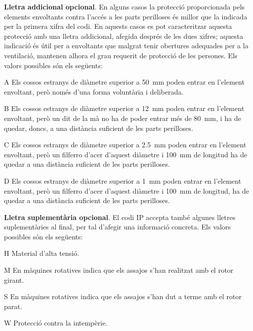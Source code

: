 \textbf{Lletra addicional opcional}. En alguns casos la protecció
proporcionada pels elements envoltants contra l'accés a les parts
perilloses és millor que la indicada per la primera xifra del codi.
En aquests casos es pot caracteritzar aquesta protecció amb una
lletra addicional, afegida després de les dues xifres; aquesta indicació és útil per a  envoltants que malgrat tenir obertures adequades per a la ventilació,  mantenen alhora el
grau requerit de protecció de les persones. Els valors possibles són
els següents:
\begin{list}{}
   {\setlength{\labelwidth}{10mm} \setlength{\leftmargin}{15mm} \setlength{\labelsep}{5mm}}
   \item[A] Els  cossos estranys de diàmetre superior a
   \qty{50}{mm}    poden entrar en l'element envoltant, però només d'una forma voluntària i deliberada.
   \item[B] Els  cossos estranys de diàmetre superior a \qty{12}{mm}
    poden entrar en l'element envoltant, però un dit de la mà no ha de poder entrar més de \qty{80}{mm}, i
    ha de quedar, doncs, a una distància    suficient de les parts perilloses.
   \item[C] Els  cossos estranys de diàmetre superior a \qty{2,5}{mm}
   poden entrar en l'element envoltant, però un filferro d'acer d'aquest diàmetre i \qty{100}{mm}
   de longitud ha de quedar a una distància suficient de les parts perilloses.
   \item[D] Els  cossos estranys de diàmetre superior a \qty{1}{mm}
   poden entrar en l'element envoltant, però un filferro d'acer d'aquest diàmetre i \qty{100}{mm}
   de longitud, ha de quedar a una distància suficient de les parts perilloses.
\end{list}

\textbf{Lletra suplementària opcional}. El codi IP accepta també algunes
lletres suplementàries al final, per tal d'afegir una informació concreta. Els valors
possibles són els següents:
\begin{list}{}
   {\setlength{\labelwidth}{10mm} \setlength{\leftmargin}{15mm} \setlength{\labelsep}{5mm}}
   \item[H] Material d'alta tensió.
   \item[M] En màquines rotatives indica que els assajos s'han realitzat amb el
    rotor girant.
   \item[S] En màquines rotatives indica que els assajos s'han dut a terme amb el
    rotor parat.
   \item[W] Protecció contra la intempèrie.
\end{list}


